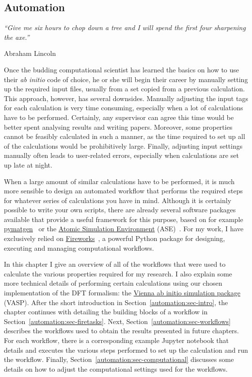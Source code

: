 \begin{refsection} 
 
\chapter{Automation} \label{chapter:automation}
 
\setlength{\epigraphwidth}{3in} 
\epigraph{\textit{``Give me six hours to chop down a tree and I will spend the 
first four sharpening the axe.''}}{Abraham Lincoln} 
\vspace{3em} 
 
Once the budding computational scientist has learned the basics on how to use 
their \textit{ab initio} code of choice, he or she will begin their career by 
manually setting up the required input files, usually from a set copied from a 
previous calculation. This approach, however, has several downsides. Manually 
adjusting the input tags for each calculation is very time consuming, 
especially when a lot of calculations have to be performed. Certainly, any 
supervisor can agree this time would be better spent analysing results and 
writing papers. Moreover, some properties cannot be feasibly calculated in 
such a manner, as the time required to set up all of the calculations would be 
prohibitively large. Finally, adjusting input settings manually often leads to 
user-related errors, especially when calculations are set up late at night.  

When a large amount of similar calculations have to be performed, it is much 
more sensible to design an automated workflow that performs the required steps 
for whatever series of calculations you have in mind. Although it is certainly 
possible to write your own scripts, there are already several software 
packages available that provide a useful framework for this purpose, based on 
for example \href{http://pymatgen.org/}{pymatgen}~\cite{Ong2013} or the 
\href{https://wiki.fysik.dtu.dk/ase/}{Atomic Simulation Environment} 
(ASE)~\cite{Larsen2017}. For my work, I have exclusively relied on 
\href{https://materialsproject.github.io/fireworks/index.html}{Fireworks}~\cite{Jain2015}, 
a powerful Python package for designing, executing and managing computational 
workflows. 
 
In this chapter I give an overview of all of the workflows that were used to 
calculate the various properties required for my research. I also explain some 
more technical details of performing certain calculations using our chosen 
implementation of the DFT formalism: the \href{https://www.vasp.at/}{Vienna ab 
initio simulation package} (VASP). After the short introduction in 
Section~\ref{automation:sec-intro}, the chapter continues with detailing the 
building blocks of a workflow in Section~\ref{automation:sec-firetasks}. Next, 
Section~\ref{automation:sec-workflows} describes the workflows used to obtain 
the results presented in future chapters. For each workflow, there is a 
corresponding example Jupyter notebook that details and executes the various 
steps performed to set up the calculation and run the workflow. Finally, 
Section~\ref{automation:sec-computational} discusses some details on how to  
adjust the computational settings used for the workflows. 
 

\end{refsection}
